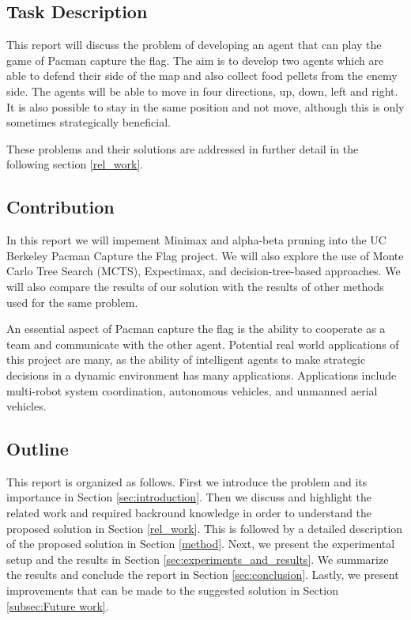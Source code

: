 \documentclass[a4paper,12pt]{article}
\begin{document}
\subsection{Task Description}

This report will discuss the problem of developing an agent that can play the game of Pacman capture the flag. 
The aim is to develop two agents which are able to defend their side of the map and also collect food pellets from the enemy side. 
The agents will be able to move in four directions, up, down, left and right. It is also possible to stay in the same position and not move, although this is only sometimes strategically beneficial.

These problems and their solutions are addressed in further detail in the following section \ref{rel_work}.




\subsection{Contribution}

In this report we will impement Minimax and alpha-beta pruning into the UC Berkeley Pacman Capture the Flag project. We will also explore the use of Monte Carlo Tree Search (MCTS), Expectimax, and decision-tree-based approaches.
We will also compare the results of our solution with the results of other methods used for the same problem.

An essential aspect of Pacman capture the flag is the ability to cooperate as a team and communicate with the other agent. 
Potential real world applications of this project are many, as the ability of intelligent agents to make strategic decisions in a dynamic environment has many applications. 
Applications include multi-robot system coordination, autonomous vehicles, and unmanned aerial vehicles.







\subsection{Outline}
This report is organized as follows. First we introduce the problem and its importance in Section \ref{sec:introduction}. Then we discuss and highlight the related work and required backround knowledge in order to understand the proposed solution in Section \ref{rel_work}. This is followed by a detailed description of the proposed solution in Section \ref{method}. Next, we present the experimental setup and the results in Section \ref{sec:experiments_and_results}.
We summarize the results and conclude the report in Section \ref{sec:conclusion}. Lastly, we present improvements that can be made to the suggested solution in Section \ref{subsec:Future work}.
\end{document}
